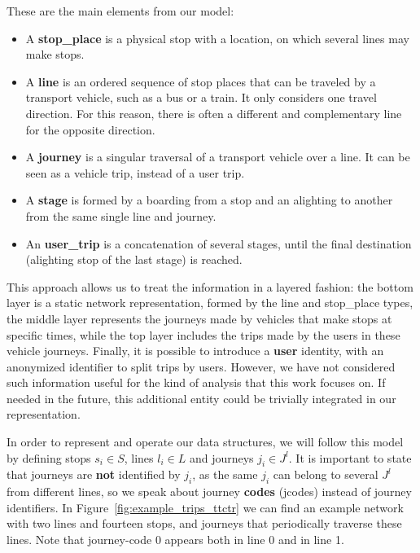    These are the main elements from our model:
    \begin{itemize}
        \item A \textbf{stop\_place} is a physical stop with a location, on which several lines may make stops.
        \item A \textbf{line} is an ordered sequence of stop places that can be traveled by a transport vehicle, such as a bus or a train. It only considers one travel direction. For this reason, there is often a different and complementary line for the opposite direction.%
        \item A \textbf{journey} is a singular traversal of a transport vehicle over a line. It can be seen as a vehicle trip, instead of a user trip.
        \item A \textbf{stage} is formed by a boarding from a stop and an alighting to another from the same single line and journey.
        \item An \textbf{user\_trip} is a concatenation of several stages, until the final destination (alighting stop of the last stage) is reached.
    \end{itemize}
	
	This approach allows us to treat the information in a layered fashion: the bottom layer is a static network representation, formed by the line and stop\_place types, the middle layer represents the journeys made by vehicles that make stops at specific times, while the top layer includes the trips made by the users in these vehicle journeys. Finally, it is possible to introduce a \textbf{user} identity, with an anonymized identifier to split trips by users. However, we have not considered such information useful for the kind of analysis that this work focuses on. If needed in the future, this additional entity could be trivially integrated in our representation.
	
	In order to represent and operate our data structures, we will follow this model by defining stops $s_i \in S$, lines $l_i \in L$ and journeys $j_i \in J^l$. It is important to state that journeys are \textbf{not} identified by $j_i$, as the same $j_i$ can belong to several $J^l$ from different lines, so we speak about journey \textbf{codes} (jcodes) instead of journey identifiers. In Figure~\ref{fig:example_trips_ttctr} we can find an example network with two lines and fourteen stops, and journeys that periodically traverse these lines. Note that \mbox{journey-code} 0 appears both in line 0 and in line 1.
	
